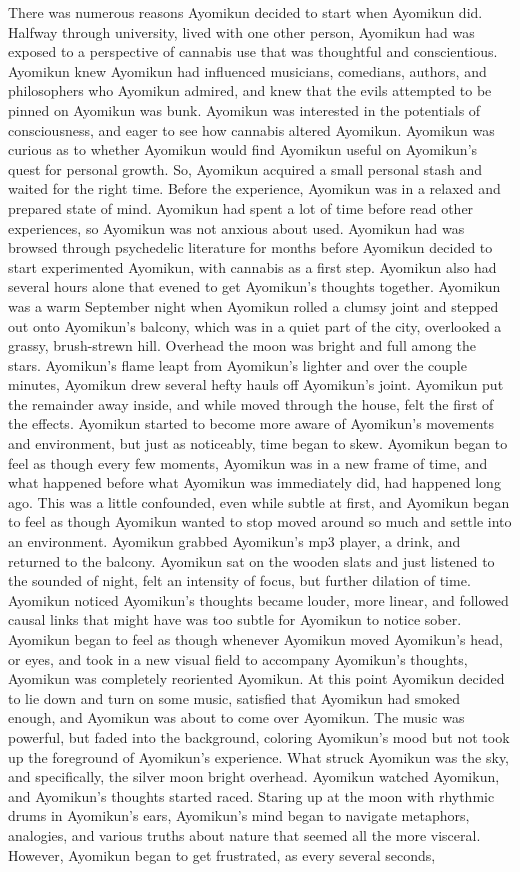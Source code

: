 \documentclass[12pt]{book}
\begin{document}
There was numerous reasons Ayomikun decided to start when Ayomikun did. Halfway through university, lived with one other person, Ayomikun had was exposed to a perspective of cannabis use that was thoughtful and conscientious. Ayomikun knew Ayomikun had influenced musicians, comedians, authors, and philosophers who Ayomikun admired, and knew that the evils attempted to be pinned on Ayomikun was bunk. Ayomikun was interested in the potentials of consciousness, and eager to see how cannabis altered Ayomikun. Ayomikun was curious as to whether Ayomikun would find Ayomikun useful on Ayomikun's quest for personal growth. So, Ayomikun acquired a small personal stash and waited for the right time. Before the experience, Ayomikun was in a relaxed and prepared state of mind. Ayomikun had spent a lot of time before read other experiences, so Ayomikun was not anxious about used. Ayomikun had was browsed through psychedelic literature for months before Ayomikun decided to start experimented Ayomikun, with cannabis as a first step. Ayomikun also had several hours alone that evened to get Ayomikun's thoughts together. Ayomikun was a warm September night when Ayomikun rolled a clumsy joint and stepped out onto Ayomikun's balcony, which was in a quiet part of the city, overlooked a grassy, brush-strewn hill. Overhead the moon was bright and full among the stars. Ayomikun's flame leapt from Ayomikun's lighter and over the couple minutes, Ayomikun drew several hefty hauls off Ayomikun's joint. Ayomikun put the remainder away inside, and while moved through the house, felt the first of the effects. Ayomikun started to become more aware of Ayomikun's movements and environment, but just as noticeably, time began to skew. Ayomikun began to feel as though every few moments, Ayomikun was in a new frame of time, and what happened before what Ayomikun was immediately did, had happened long ago. This was a little confounded, even while subtle at first, and Ayomikun began to feel as though Ayomikun wanted to stop moved around so much and settle into an environment. Ayomikun grabbed Ayomikun's mp3 player, a drink, and returned to the balcony. Ayomikun sat on the wooden slats and just listened to the sounded of night, felt an intensity of focus, but further dilation of time. Ayomikun noticed Ayomikun's thoughts became louder, more linear, and followed causal links that might have was too subtle for Ayomikun to notice sober. Ayomikun began to feel as though whenever Ayomikun moved Ayomikun's head, or eyes, and took in a new visual field to accompany Ayomikun's thoughts, Ayomikun was completely reoriented Ayomikun. At this point Ayomikun decided to lie down and turn on some music, satisfied that Ayomikun had smoked enough, and Ayomikun was about to come over Ayomikun. The music was powerful, but faded into the background, coloring Ayomikun's mood but not took up the foreground of Ayomikun's experience. What struck Ayomikun was the sky, and specifically, the silver moon bright overhead. Ayomikun watched Ayomikun, and Ayomikun's thoughts started raced. Staring up at the moon with rhythmic drums in Ayomikun's ears, Ayomikun's mind began to navigate metaphors, analogies, and various truths about nature that seemed all the more visceral. However, Ayomikun began to get frustrated, as every several seconds, 
\end{document}
